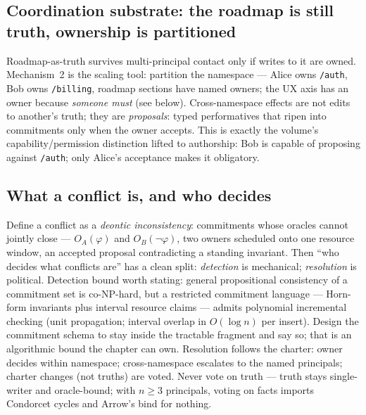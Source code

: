 \documentclass[11pt,a4paper]{article}
\theoremstyle{definition}
\theoremstyle{remark}
\begin{document}
\subsection{Coordination substrate: the roadmap is still truth, ownership is partitioned}
Roadmap-as-truth survives multi-principal contact only if writes to it are owned. Mechanism~2 is the scaling tool: partition the namespace --- Alice owns \texttt{/auth}, Bob owns \texttt{/billing}, roadmap sections have named owners; the UX axis has an owner because \emph{someone must} (see below). Cross-namespace effects are not edits to another's truth; they are \emph{proposals}: typed performatives that ripen into commitments only when the owner accepts. This is exactly the volume's capability/permission distinction lifted to authorship: Bob is capable of proposing against \texttt{/auth}; only Alice's acceptance makes it obligatory.

\subsection{What a conflict is, and who decides}
Define a conflict as a \emph{deontic inconsistency}: commitments whose oracles cannot jointly close --- $O_A(\varphi)$ and $O_B(\neg\varphi)$, two owners scheduled onto one resource window, an accepted proposal contradicting a standing invariant. Then ``who decides what conflicts are'' has a clean split: \emph{detection} is mechanical; \emph{resolution} is political. Detection bound worth stating: general propositional consistency of a commitment set is co-NP-hard, but a restricted commitment language --- Horn-form invariants plus interval resource claims --- admits polynomial incremental checking (unit propagation; interval overlap in $O(\log n)$ per insert). Design the commitment schema to stay inside the tractable fragment and say so; that is an algorithmic bound the chapter can own. Resolution follows the charter: owner decides within namespace; cross-namespace escalates to the named principals; charter changes (not truths) are voted. Never vote on truth --- truth stays single-writer and oracle-bound; with $n \ge 3$ principals, voting on facts imports Condorcet cycles and Arrow's bind for nothing.
\end{document}
